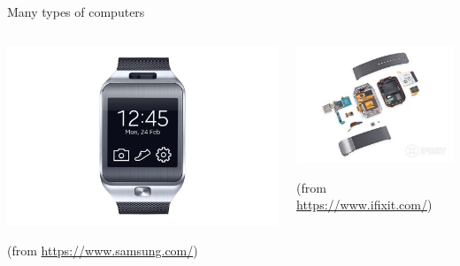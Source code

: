 \begin{frame}{Many types of computers}

  \begin{columns}

    \begin{column}{.5\textwidth}

      \includegraphics[width=\textwidth]{images/samsung-gear-compressed.jpeg}

      \begin{center}
        {\tiny(from \url{https://www.samsung.com/})}
      \end{center}
    \end{column}

    \begin{column}{.5\textwidth}
      \includegraphics[width=\textwidth]{images/gear2-ifixit.jpg}

      \begin{center}
        {\tiny (from \url{https://www.ifixit.com/})}
      \end{center}
    \end{column}

  \end{columns}

\end{frame}

